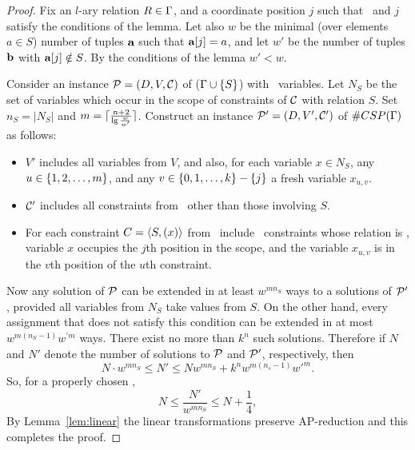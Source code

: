 \begin{proof} 
Fix an \(l\)-ary relation \(R \in \Gamma\)\@, and 
a coordinate position \(j\) such that \mR\ and \(j\) satisfy the conditions of the lemma.
Let also \(w\) be the minimal (over elements \(a\in S\)) number of tuples \(\textbf{a}\)
such that \(\textbf{a}[j]=a\), and let \(w'\) be the number of tuples \(\textbf{b}\) with
\(\textbf{a}[j] \notin S\). By the conditions of the lemma \(w'<w\)\@.

Consider an instance \(\mathcal{P}=(D,V,\mathcal{C})\) of \ccsp(\(\Gamma \cup \{{S}\}\))
with \mn\ variables. Let \(N_S\) be the set of
variables which occur in the scope of constraints of \(\mathcal{C}\) with relation \(S\)\@. 
Set \(n_S = |N_S|\) and \(m = \lceil\frac{n+2}{\lg{\frac{w}{w'}}}\rceil\)\@.
Construct an instance \(\mathcal{P}'=(D,V',\mathcal{C}')\) of \(\#CSP(\Gamma)\) as follows:
\begin{itemize}
\item
\(V'\) includes all variables from \(V\),
and also, for each variable \(x \in N_S\), any \(u \in \{{{1,2,\dotsc,m}}\}\), and any
\(v\in\{{0,1,\dotsc,k}\}-\{j\}\) a fresh variable \(x_{u,v}\)\@. 
\item 
\(\mathcal{C}'\) includes all constraints from \mconset\ other than those involving \(S\)\@. 
\item
For each constraint \(C=\langle S, (x) \rangle\) from \mconset\ include \mm\ constraints whose
relation is \mR, variable \(x\) occupies the \(j\)th position in the scope,
and the variable \(x_{u,v}\) is in the \(v\)th position of the \(u\)th constraint.
\end{itemize}

Now any solution of \(\mathcal{P}\) can be extended in at least \(w^{mn_S}\) 
ways to a solutions of \(\mathcal{P}'\)\@, provided all variables from \(N_S\)
take values from \(S\)\@. On the other hand, every assignment that does not satisfy this
condition can be extended in at most \(w^{m(n_S-1)}w^{\prime m}\) ways.
There exist no more than \(k^n\) such solutions. Therefore if \(N\) and \(N'\)
denote the number of solutions to \(\mathcal{P}\) and \(\mathcal{P}'\), respectively, then
\[N\cdot w^{mn_S} \le N' \le Nw^{mn_S} + k^nw^{m(n_s-1)}w'^m.\]
So, for a properly chosen \mm, 
\[N \le \frac{N'}{w^{mn_S}} \le N + \frac{1}{4},\]
By Lemma~\ref{lem:linear} the linear transformations preserve AP-reduction
and this completes the proof.
\end{proof}


